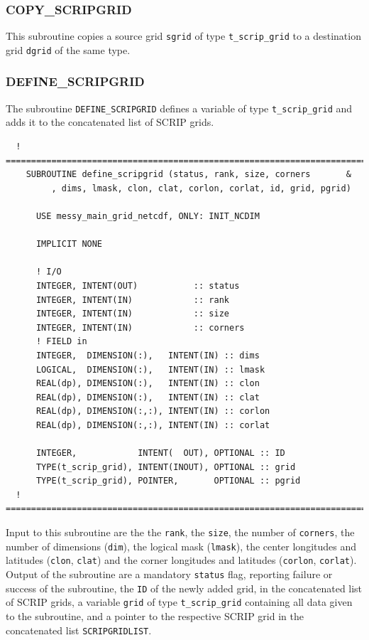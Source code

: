 \documentclass[11pt,twoside]{article}
\begin{document}
\subsubsection{COPY\_SCRIPGRID \label{COPYSG}}
This subroutine copies a source grid \verb|sgrid| of
type \verb|t_scrip_grid| to a destination grid \verb|dgrid| of the
same type. 

\subsubsection{DEFINE\_SCRIPGRID\label{DEFSG}}
The subroutine \verb|DEFINE_SCRIPGRID| defines a variable of
type \verb|t_scrip_grid| and adds it to the concatenated list of SCRIP grids.

\begin{verbatim}
  ! ================================================================================
    SUBROUTINE define_scripgrid (status, rank, size, corners       &
         , dims, lmask, clon, clat, corlon, corlat, id, grid, pgrid)

      USE messy_main_grid_netcdf, ONLY: INIT_NCDIM

      IMPLICIT NONE

      ! I/O
      INTEGER, INTENT(OUT)           :: status
      INTEGER, INTENT(IN)            :: rank
      INTEGER, INTENT(IN)            :: size
      INTEGER, INTENT(IN)            :: corners
      ! FIELD in
      INTEGER,  DIMENSION(:),   INTENT(IN) :: dims
      LOGICAL,  DIMENSION(:),   INTENT(IN) :: lmask
      REAL(dp), DIMENSION(:),   INTENT(IN) :: clon
      REAL(dp), DIMENSION(:),   INTENT(IN) :: clat
      REAL(dp), DIMENSION(:,:), INTENT(IN) :: corlon
      REAL(dp), DIMENSION(:,:), INTENT(IN) :: corlat

      INTEGER,            INTENT(  OUT), OPTIONAL :: ID
      TYPE(t_scrip_grid), INTENT(INOUT), OPTIONAL :: grid 
      TYPE(t_scrip_grid), POINTER,       OPTIONAL :: pgrid
  ! ================================================================================

\end{verbatim}
Input to this subroutine are the
the \verb|rank|, the \verb|size|, the number of \verb|corners|, the
number of dimensions (\verb|dim|), the logical mask (\verb|lmask|), the
center longitudes and latitudes (\verb|clon|, \verb|clat|) and the
corner longitudes and latitudes (\verb|corlon|, \verb|corlat|).
Output of the subroutine are a mandatory \verb|status| flag, reporting
failure or success of the subroutine, the \verb|ID| of the newly added
grid, in the concatenated list of SCRIP grids, a variable \verb|grid|
of type \verb|t_scrip_grid| containing all data given to the
subroutine, and a pointer to the respective SCRIP grid in the
concatenated list \verb|SCRIPGRIDLIST|.
\end{document}
